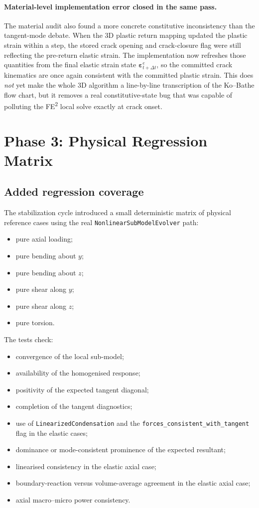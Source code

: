 \paragraph{Material-level implementation error closed in the same pass.}
The material audit also found a more concrete constitutive inconsistency than
the tangent-mode debate.  When the 3D plastic return mapping updated the
plastic strain within a step, the stored crack opening and crack-closure flag
were still reflecting the pre-return elastic strain.  The implementation now
refreshes those quantities from the final elastic strain state
\(\boldsymbol{\varepsilon}^{e}_{t+\Delta t}\), so the committed crack
kinematics are once again consistent with the committed plastic strain.  This
does \emph{not} yet make the whole 3D algorithm a line-by-line transcription of
the Ko--Bathe flow chart, but it removes a real constitutive-state bug that was
capable of polluting the FE\textsuperscript{2} local solve exactly at crack
onset.

\section{Phase 3: Physical Regression Matrix}
\label{sec:ms-stab-phase3}

\subsection{Added regression coverage}

The stabilization cycle introduced a small deterministic matrix of physical
reference cases using the real \texttt{NonlinearSubModelEvolver} path:
\begin{itemize}
  \item pure axial loading;
  \item pure bending about \(y\);
  \item pure bending about \(z\);
  \item pure shear along \(y\);
  \item pure shear along \(z\);
  \item pure torsion.
\end{itemize}

The tests check:
\begin{itemize}
  \item convergence of the local sub-model;
  \item availability of the homogenised response;
  \item positivity of the expected tangent diagonal;
  \item completion of the tangent diagnostics;
  \item use of \texttt{LinearizedCondensation} and the
    \texttt{forces\_consistent\_with\_tangent} flag in the elastic cases;
  \item dominance or mode-consistent prominence of the expected resultant;
  \item linearised consistency in the elastic axial case;
  \item boundary-reaction versus volume-average agreement in the elastic axial
    case;
  \item axial macro--micro power consistency.
\end{itemize}

